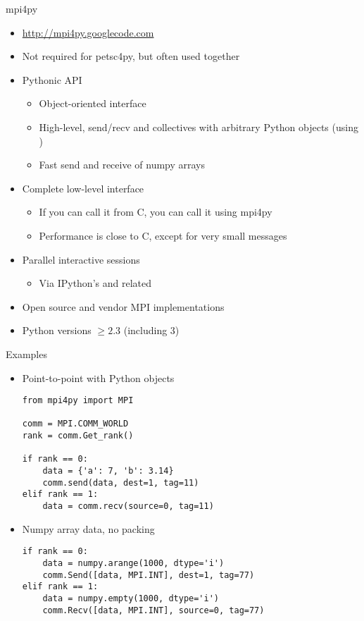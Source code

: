 \begin{frame}[fragile]{mpi4py}
  \begin{itemize}
  \item \url{http://mpi4py.googlecode.com}
  \item Not required for petsc4py, but often used together
  \item Pythonic API
    \begin{itemize}
    \item Object-oriented interface
    \item High-level, send/recv and collectives with arbitrary Python objects (using )
    \item Fast send and receive of numpy arrays
    \end{itemize}
  \item Complete low-level interface
    \begin{itemize}
    \item If you can call it from C, you can call it using mpi4py
    \item Performance is close to C, except for very small messages
    \end{itemize}
  \item Parallel interactive sessions
    \begin{itemize}
    \item Via IPython's  and related
    \end{itemize}
  \item Open source and vendor MPI implementations
  \item Python versions $\ge 2.3$ (including $3$)
  \end{itemize}
\end{frame}

\begin{frame}[fragile,shrink=.1]{Examples}
\begin{itemize}
\item Point-to-point with Python objects
  \begin{verbatim}
from mpi4py import MPI

comm = MPI.COMM_WORLD
rank = comm.Get_rank()

if rank == 0:
    data = {'a': 7, 'b': 3.14}
    comm.send(data, dest=1, tag=11)
elif rank == 1:
    data = comm.recv(source=0, tag=11)
  \end{verbatim}
\item Numpy array data, no packing
  \begin{verbatim}
if rank == 0: 
    data = numpy.arange(1000, dtype='i')
    comm.Send([data, MPI.INT], dest=1, tag=77)
elif rank == 1:
    data = numpy.empty(1000, dtype='i')
    comm.Recv([data, MPI.INT], source=0, tag=77)
  \end{verbatim}
\end{itemize}
\end{frame}
